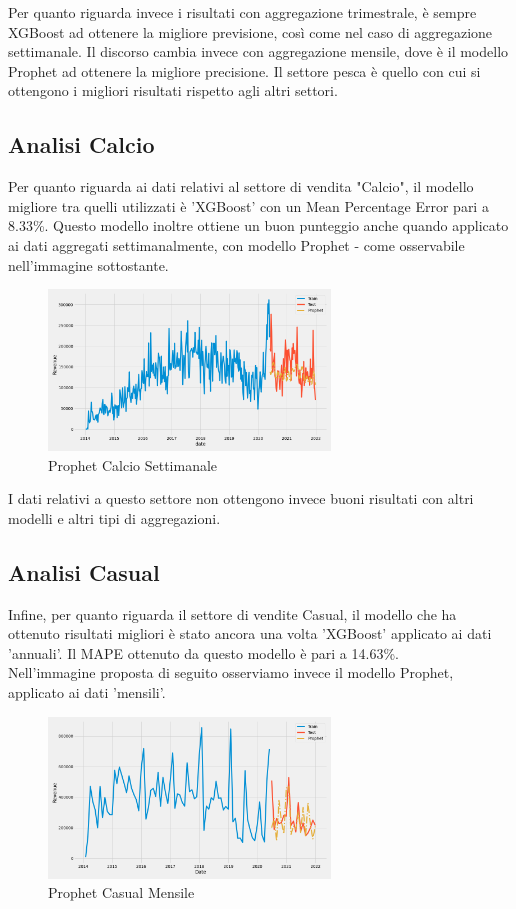 \documentclass[12pt, a4paper, twocolumn]{article} %
\begin{document}
Per quanto riguarda invece i risultati con aggregazione trimestrale, è sempre XGBoost ad ottenere la migliore previsione, così come nel caso di aggregazione settimanale. Il discorso cambia invece con aggregazione mensile, dove è il modello Prophet ad ottenere la migliore precisione. Il settore pesca è quello con cui si ottengono i migliori risultati rispetto agli altri settori.

\subsection{Analisi Calcio}
Per quanto riguarda ai dati relativi al settore di vendita "Calcio", il modello migliore tra quelli utilizzati è 'XGBoost' con un Mean Percentage Error pari a 8.33\%. Questo modello inoltre ottiene un buon punteggio anche quando applicato ai dati aggregati settimanalmente, con modello Prophet - come osservabile nell'immagine sottostante.
\begin{figure}[H]
  \caption{Prophet Calcio Settimanale}
  \begin{center}
    \includegraphics[width=75mm,scale=0.5]{Calcio_settimanale_19.07}
  \end{center}
\end{figure}

I dati relativi a questo settore non ottengono invece buoni risultati con altri modelli e altri tipi di aggregazioni.

\subsection{Analisi Casual}
Infine, per quanto riguarda il settore di vendite Casual, il modello che ha ottenuto risultati migliori è stato ancora una volta 'XGBoost' applicato ai dati 'annuali'. Il MAPE ottenuto da questo modello è pari a 14.63\%.\\
Nell'immagine proposta di seguito osserviamo invece il modello Prophet, applicato ai dati 'mensili'.
\begin{figure}[H]
  \caption{Prophet Casual Mensile}
  \begin{center}
    \includegraphics[width=75mm,scale=0.5]{Casual_mensile_22.88}
  \end{center}
\end{figure}
\end{document}
